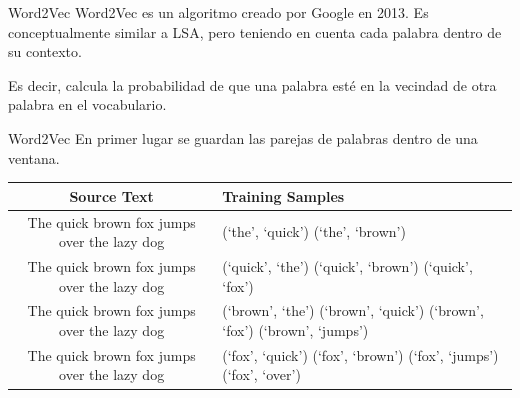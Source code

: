 \documentclass[table]{beamer}
\begin{document}
  \begin{frame}{Word2Vec}
      Word2Vec es un algoritmo creado por Google en 2013. Es conceptualmente similar a LSA, pero teniendo en cuenta cada palabra dentro de su contexto.

      Es decir, calcula la probabilidad de que una palabra esté en la vecindad de otra palabra en el vocabulario.
  \end{frame}

  \begin{frame}{Word2Vec}
      En primer lugar se guardan las parejas de palabras dentro de una ventana.
      \tiny
      \begin{table}
          \centering
          \begin{tabular}{cp{45mm}}
              \toprule
              Source Text & Training Samples \\
              \midrule
              \colorbox{blue!20}{\colorbox{red!20}{The} quick brown} fox jumps over the lazy dog & (`the', `quick') \newline (`the', `brown') \\
              \midrule
              \colorbox{blue!20}{The \colorbox{red!20}{quick} brown fox} jumps over the lazy dog & (`quick', `the') \newline (`quick', `brown') \newline (`quick', `fox') \\
              \midrule
              \colorbox{blue!20}{The quick \colorbox{red!20}{brown} fox jumps} over the lazy dog & (`brown', `the') \newline (`brown', `quick') \newline (`brown', `fox') \newline (`brown', `jumps') \\
              \midrule
              The \colorbox{blue!20}{quick brown \colorbox{red!20}{fox} jumps over} the lazy dog & (`fox', `quick') \newline (`fox', `brown') \newline (`fox', `jumps') \newline (`fox', `over') \\
              \bottomrule
          \end{tabular}
      \end{table}
  \end{frame}
\end{document}
